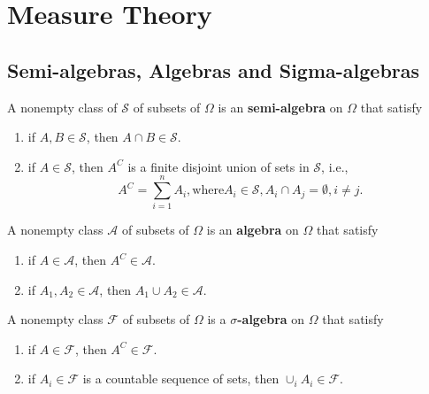\chapter{Measure Theory}

\section{Semi-algebras, Algebras and Sigma-algebras}

\begin{definition}
	A nonempty class of $\mathcal{S}$ of subsets of $\Omega$ is an \textbf{semi-algebra} on $\Omega$ that satisfy
	\begin{enumerate}
		\item if $A,B\in\mathcal{S}$, then $A\cap B\in\mathcal{S}$.
		\item if $A\in\mathcal{S}$, then $A^C$ is a finite disjoint union of sets in $\mathcal{S}$, i.e., $$A^C=\sum_{i=1}^{n}A_i, \text{where} A_i\in\mathcal{S}, A_i\cap A_j=\emptyset ,i\neq j.$$
	\end{enumerate}
\end{definition}

\begin{definition}[Algebra]
	A nonempty class $\mathcal{A}$ of subsets of $\Omega$ is an \textbf{algebra} on $\Omega$ that satisfy
	\begin{enumerate}
		\item if $A\in\mathcal{A}$, then $A^C\in\mathcal{A}$.
		\item if $A_1, A_2\in\mathcal{A}$, then $A_1\cup A_2\in\mathcal{A}$.
	\end{enumerate}
\end{definition}



\begin{definition}
	A nonempty class $\mathcal{F}$ of subsets of $\Omega$ is a \textbf{$\sigma$-algebra} on $\Omega$ that satisfy
	\begin{enumerate}
		\item if $A\in\mathcal{F}$, then $A^C\in\mathcal{F}$.
		\item if $A_i\in\mathcal{F}$ is a countable sequence of sets, then $\cup_iA_i\in\mathcal{F}$.
	\end{enumerate}
\end{definition}

